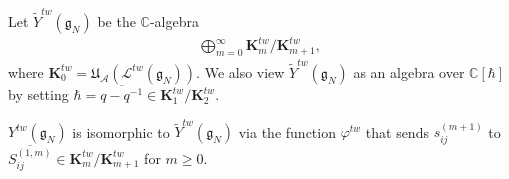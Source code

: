Let $\widetilde{Y}^{tw}(\mathfrak{g}_N)$ be the $\mathbb{C}$-algebra
\begin{gather*}
\bigoplus_{m=0}^{\infty} \mathbf{K}_m^{tw}/\mathbf{K}_{m+1}^{tw},
\end{gather*}
where $\mathbf{K}_0^{tw} = \mathfrak{U}_{\mathcal{A}}(\mathcal{L}^{tw}(\mathfrak{g}_N))$.
We also view $\widetilde{Y}^{tw}(\mathfrak{g}_N)$ as an algebra over $\mathbb{C}[\hbar]$ by setting $\hbar =
\overline{q-q^{-1}} \in \mathbf{K}_1^{tw}/\mathbf{K}_2^{tw}$.

\begin{theorem}
\label{twUqY2}
$Y^{tw}(\mathfrak{g}_N)$ is isomorphic to $\widetilde{Y}^{tw}(\mathfrak{g}_N)$ via the function $\varphi^{tw}$ that
sends $s_{ij}^{(m+1)}$ to $\overline{S_{ij}^{(1,m)}} \in \mathbf{K}_{m}^{tw}/\mathbf{K}_{m+1}^{tw}$ for $m \ge 0$.
\end{theorem}

